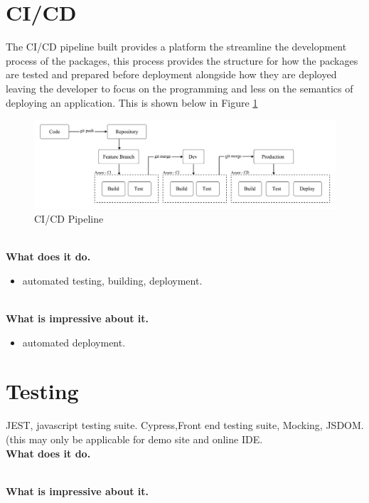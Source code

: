 \documentclass{l4proj}
\begin{document}
\section{CI/CD}
\text The CI/CD pipeline built provides a platform the streamline the development process of the packages, this process provides the structure for how the packages are tested and prepared before deployment alongside how they are deployed leaving the developer to focus on the programming and less on the semantics of deploying an application. This is shown below in Figure \ref{fig:CICDPipeline}

\begin{figure}[!ht]
    \begin{center}
        
    
    \includegraphics[width=14cm]{dissertation/images/CICD-structure.png}
    \end{center}
    \caption{CI/CD Pipeline}
    \label{fig:CICDPipeline}
\end{figure}
\\
\textbf{What does it do.}
\begin{itemize}
    \item automated testing, building, deployment.
\end{itemize}
\\
\textbf{What is impressive about it.}
\begin{itemize}
    \item automated deployment.
\end{itemize}


\section{Testing}
\text JEST, javascript testing suite. Cypress,Front end testing suite, Mocking, JSDOM. (this may only be applicable for demo site and online IDE.
\\
\textbf{What does it do.}

\\
\textbf{What is impressive about it.}
\end{document}
